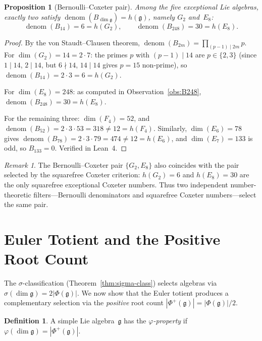 \documentclass[11pt]{amsart}
\theoremstyle{plain}
\newtheorem{proposition}[theorem]{Proposition}
\theoremstyle{definition}
\newtheorem{definition}[theorem]{Definition}
\theoremstyle{remark}
\newtheorem{remark}[theorem]{Remark}
\newcommand{\fg}{\mathfrak{g}}
\renewcommand{\Phi}{\varPhi}
\newcommand{\denom}{\operatorname{denom}}
\begin{document}
\begin{proposition}[Bernoulli--Coxeter pair]\label{prop:bernoulli-pair}
Among the five exceptional Lie algebras, exactly two satisfy
$\denom(B_{\dim\fg}) = h(\fg)$, namely $G_2$ and~$E_8$:
\[
  \denom(B_{14}) = 6 = h(G_2), \qquad
  \denom(B_{248}) = 30 = h(E_8).
\]
\end{proposition}

\begin{proof}
By the von Staudt--Clausen theorem, $\denom(B_{2m}) = \prod_{(p-1)\mid 2m} p$.
For $\dim(G_2) = 14 = 2 \cdot 7$: the primes $p$ with $(p-1) \mid 14$
are $p \in \{2, 3\}$ (since $1 \mid 14$, $2 \mid 14$, but $6 \nmid 14$,
$14 \mid 14$ gives $p = 15$ non-prime), so
$\denom(B_{14}) = 2 \cdot 3 = 6 = h(G_2)$.

For $\dim(E_8) = 248$: as computed in Observation~\ref{obs:B248},
$\denom(B_{248}) = 30 = h(E_8)$.

For the remaining three: $\dim(F_4) = 52$, and
$\denom(B_{52}) = 2 \cdot 3 \cdot 53 = 318 \ne 12 = h(F_4)$.
Similarly, $\dim(E_6) = 78$ gives $\denom(B_{78}) = 2 \cdot 3 \cdot 79
= 474 \ne 12 = h(E_6)$, and $\dim(E_7) = 133$ is odd, so
$B_{133} = 0$.  Verified in Lean~4.
\end{proof}

\begin{remark}\label{rem:bernoulli-squarefree}
The Bernoulli--Coxeter pair $\{G_2, E_8\}$ also coincides with the
pair selected by the squarefree Coxeter criterion: $h(G_2) = 6$ and
$h(E_8) = 30$ are the only squarefree exceptional Coxeter numbers.
Thus two independent number-theoretic filters---Bernoulli denominators
and squarefree Coxeter numbers---select the same pair.
\end{remark}

\section{Euler Totient and the Positive Root Count}\label{sec:totient-roots}

The $\sigma$-classification (Theorem~\ref{thm:sigma-class}) selects
algebras via $\sigma(\dim\fg) = 2|\Phi(\fg)|$.  We now show that the
Euler totient produces a complementary selection via the \emph{positive}
root count $|\Phi^+(\fg)| = |\Phi(\fg)|/2$.

\begin{definition}\label{def:totient-property}
A simple Lie algebra~$\fg$ has the \emph{$\varphi$-property} if
$\varphi(\dim\fg) = |\Phi^+(\fg)|$.
\end{definition}
\end{document}

